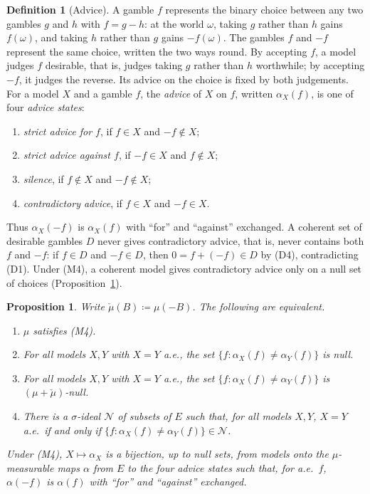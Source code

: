 \documentclass[11pt]{article}
\theoremstyle{plain}
\newtheorem{proposition}[theorem]{Proposition}
\theoremstyle{definition}
\newtheorem{definition}[theorem]{Definition}
\begin{document}
\begin{definition}[Advice]\label{def:advice}
A gamble $f$ represents the binary choice between any two gambles $g$ and $h$ with $f=g-h$:
at the world $\omega$, taking $g$ rather than $h$ gains $f(\omega)$, and taking $h$ rather
than $g$ gains $-f(\omega)$. The gambles $f$ and $-f$ represent the same choice, written the
two ways round. By accepting $f$, a model judges $f$ desirable, that is, judges taking $g$
rather than $h$ worthwhile; by accepting $-f$, it judges the reverse. Its advice on the
choice is fixed by both judgements. For a model $X$ and a gamble $f$, the \emph{advice} of
$X$ on $f$, written $\alpha_X(f)$, is one of four \emph{advice states}:
\begin{enumerate}[label=(\roman*)]
  \item \emph{strict advice for $f$}, if $f\in X$ and $-f\notin X$;
  \item \emph{strict advice against $f$}, if $-f\in X$ and $f\notin X$;
  \item \emph{silence}, if $f\notin X$ and $-f\notin X$;
  \item \emph{contradictory advice}, if $f\in X$ and $-f\in X$.
\end{enumerate}
Thus $\alpha_X(-f)$ is $\alpha_X(f)$ with ``for'' and ``against'' exchanged. A coherent set of
desirable gambles $D$ never gives contradictory advice, that is, never contains both $f$ and
$-f$: if $f\in D$ and $-f\in D$, then $0=f+(-f)\in D$ by (D4), contradicting (D1). Under (M4), a coherent model gives contradictory
advice only on a null set of choices (Proposition~\ref{prop:advice}).
\end{definition}

\begin{proposition}\label{prop:advice}
Write $\check\mu(B)\coloneqq\mu(-B)$. The following are equivalent.
\begin{enumerate}[label=(\alph*)]
  \item $\mu$ satisfies (M4).
  \item For all models $X,Y$ with $X=Y$ a.e., the set $\{f:\alpha_X(f)\ne\alpha_Y(f)\}$ is null.
  \item For all models $X,Y$ with $X=Y$ a.e., the set $\{f:\alpha_X(f)\ne\alpha_Y(f)\}$ is
  $(\mu+\check\mu)$-null.
  \item There is a $\sigma$-ideal $\mathcal N$ of subsets of $E$ such that, for all models $X,Y$,
  $X=Y$ a.e.\ if and only if $\{f:\alpha_X(f)\ne\alpha_Y(f)\}\in\mathcal N$.
\end{enumerate}
Under (M4), $X\mapsto\alpha_X$ is a bijection, up to null sets, from models onto the
$\mu$-measurable maps $\alpha$ from $E$ to the four advice states such that, for a.e.\ $f$,
$\alpha(-f)$ is $\alpha(f)$ with ``for'' and ``against'' exchanged.
\end{proposition}
\end{document}
